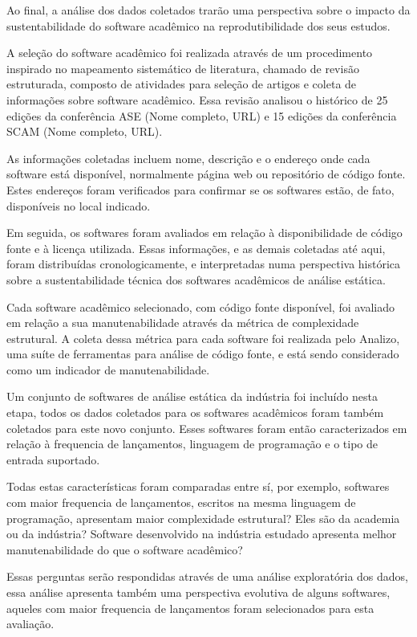 Ao final, a análise dos dados coletados trarão uma perspectiva sobre o impacto da sustentabilidade do software acadêmico na reprodutibilidade dos seus estudos.

A seleção do software acadêmico foi realizada através de um procedimento inspirado no mapeamento sistemático de literatura, chamado de revisão estruturada, composto de atividades para seleção de artigos e coleta de informações sobre software  acadêmico. Essa revisão analisou o histórico de 25 edições da conferência ASE (Nome completo, URL) e 15 edições da conferência SCAM (Nome completo, URL).

As informações coletadas incluem nome, descrição e o endereço onde cada software está disponível, normalmente página web ou repositório de código fonte. Estes
endereços foram verificados para confirmar se os softwares estão, de fato,
disponíveis no local indicado.

Em seguida, os softwares foram avaliados em relação à disponibilidade de código fonte e à licença utilizada. Essas informações, e as demais coletadas até aqui, foram distribuídas cronologicamente, e interpretadas numa perspectiva histórica sobre a sustentabilidade técnica dos softwares acadêmicos de análise estática.

Cada software acadêmico selecionado, com código fonte disponível, foi avaliado em relação a sua manutenabilidade através da métrica de complexidade estrutural. A coleta dessa métrica para cada software foi realizada pelo Analizo, uma suíte
de ferramentas para análise de código fonte, e está sendo considerado como um
indicador de manutenabilidade.

Um conjunto de softwares de análise estática da indústria foi incluído nesta etapa, todos os dados coletados para os softwares acadêmicos foram também coletados para este novo conjunto. Esses softwares foram então caracterizados em relação à frequencia de lançamentos, linguagem de programação e o tipo de entrada suportado.

Todas estas características foram comparadas entre sí, por exemplo, softwares com maior frequencia de lançamentos, escritos na mesma linguagem de
programação, apresentam maior complexidade estrutural? Eles são da academia ou da indústria? Software desenvolvido na indústria estudado apresenta melhor manutenabilidade do que o software acadêmico?

Essas perguntas serão respondidas através de uma análise exploratória dos dados, essa análise apresenta também uma perspectiva evolutiva de alguns softwares, aqueles com maior frequencia de lançamentos foram selecionados para
esta avaliação.

